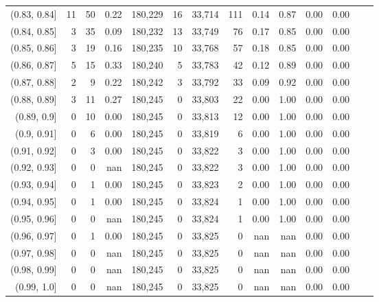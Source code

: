 \begin{tabular}{rrrrrrrrrrrrrr}
(0.83, 0.84]   &     11 &   50 &    0.22 &  180,229 &       16 &  33,714 &     111 &  0.14 &  0.87 &  0.00 &      0.00 \\
(0.84, 0.85]   &      3 &   35 &    0.09 &  180,232 &       13 &  33,749 &      76 &  0.17 &  0.85 &  0.00 &      0.00 \\
(0.85, 0.86]   &      3 &   19 &    0.16 &  180,235 &       10 &  33,768 &      57 &  0.18 &  0.85 &  0.00 &      0.00 \\
(0.86, 0.87]   &      5 &   15 &    0.33 &  180,240 &        5 &  33,783 &      42 &  0.12 &  0.89 &  0.00 &      0.00 \\
(0.87, 0.88]   &      2 &    9 &    0.22 &  180,242 &        3 &  33,792 &      33 &  0.09 &  0.92 &  0.00 &      0.00 \\
(0.88, 0.89]   &      3 &   11 &    0.27 &  180,245 &        0 &  33,803 &      22 &  0.00 &  1.00 &  0.00 &      0.00 \\
(0.89, 0.9]    &      0 &   10 &    0.00 &  180,245 &        0 &  33,813 &      12 &  0.00 &  1.00 &  0.00 &      0.00 \\
(0.9, 0.91]    &      0 &    6 &    0.00 &  180,245 &        0 &  33,819 &       6 &  0.00 &  1.00 &  0.00 &      0.00 \\
(0.91, 0.92]   &      0 &    3 &    0.00 &  180,245 &        0 &  33,822 &       3 &  0.00 &  1.00 &  0.00 &      0.00 \\
(0.92, 0.93]   &      0 &    0 &     nan &  180,245 &        0 &  33,822 &       3 &  0.00 &  1.00 &  0.00 &      0.00 \\
(0.93, 0.94]   &      0 &    1 &    0.00 &  180,245 &        0 &  33,823 &       2 &  0.00 &  1.00 &  0.00 &      0.00 \\
(0.94, 0.95]   &      0 &    1 &    0.00 &  180,245 &        0 &  33,824 &       1 &  0.00 &  1.00 &  0.00 &      0.00 \\
(0.95, 0.96]   &      0 &    0 &     nan &  180,245 &        0 &  33,824 &       1 &  0.00 &  1.00 &  0.00 &      0.00 \\
(0.96, 0.97]   &      0 &    1 &    0.00 &  180,245 &        0 &  33,825 &       0 &   nan &   nan &  0.00 &      0.00 \\
(0.97, 0.98]   &      0 &    0 &     nan &  180,245 &        0 &  33,825 &       0 &   nan &   nan &  0.00 &      0.00 \\
(0.98, 0.99]   &      0 &    0 &     nan &  180,245 &        0 &  33,825 &       0 &   nan &   nan &  0.00 &      0.00 \\
(0.99, 1.0]    &      0 &    0 &     nan &  180,245 &        0 &  33,825 &       0 &   nan &   nan &  0.00 &      0.00 \\
\bottomrule
\end{tabular}
